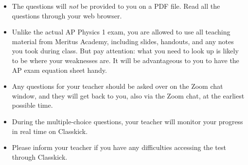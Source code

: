 \documentclass[letterpaper,11pt]{article}
\begin{document}
\begin{itemize}[leftmargin=18pt]
\begin{itemize}[leftmargin=20pt]
{    equations. They will not be counted towards your marks.}
  \item In an \emph{actual} AP Physics 1 exam, you will have 90 minutes to
    complete 7 questions of various lengths and difficulties. The total mark
    for each questions is printed on the test itself.
  \item Please write clearly. Your AP Physics teacher has many superpowers,
    but mind-reading is not one of them.
  \end{itemize}
\item The questions will \emph{not} be provided to you on a PDF file. Read
  all the questions through your web browser.
\item Unlike the actual AP Physics 1 exam, you are allowed to use all teaching
  material from Meritus Academy, including slides, handouts, and any notes you
  took during class. But pay attention: what you need to look up is likely to
  be where your weaknesses are. It will be advantageous to you to have the
  AP exam equation sheet handy.
\item Any questions for your teacher should be asked over on the Zoom chat
  window, and they will get back to you, also via the Zoom chat, at the
  earliest possible time.
\item During the multiple-choice questions, your teacher will monitor your
  progress in real time on Classkick.
\item Please inform your teacher if you have any difficulties accessing the
  test through Classkick.
\end{itemize}
\end{document}
